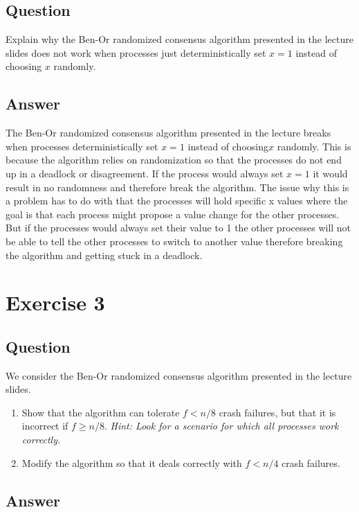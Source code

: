 \documentclass{article}
\begin{document}
\subsection*{Question}
Explain why the Ben-Or randomized consensus algorithm presented in the lecture slides does not work when processes just deterministically set $x = 1$ instead of choosing $x$ randomly.

\subsection*{Answer}
The Ben-Or randomized consensus algorithm presented in the lecture breaks when processes deterministically set $x = 1$ instead of choosing\( x\) randomly. This is because the algorithm relies on randomization so that the processes do not end up in a deadlock or disagreement. If the process would always set \(x = 1\) it would result in no randomness and therefore break the algorithm. The issue why this is a problem has to do with that the processes will hold specific x values where the goal is that each process might propose a value change for the other processes. But if the processes would always set their value to 1 the other processes will not be able to tell the other processes to switch to another value therefore breaking the algorithm and getting stuck in a deadlock.


\section*{Exercise 3}
\subsection*{Question}
We consider the Ben-Or randomized consensus algorithm presented in the lecture slides.

\begin{enumerate}
    \item Show that the algorithm can tolerate $f < n/8$ crash failures, but that it is incorrect if $f \geq n/8$. \textit{Hint: Look for a scenario for which all processes work correctly.}
    \item Modify the algorithm so that it deals correctly with $f < n/4$ crash failures.
\end{enumerate}

\subsection*{Answer}
\end{document}
